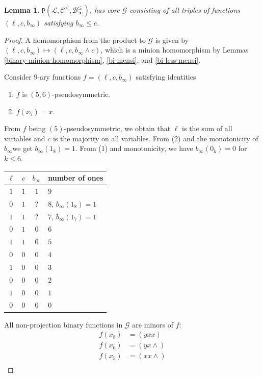 \documentclass{amsart}
\numberwithin{equation}{section}
\theoremstyle{plain}
\newtheorem{lemma}[theorem]{Lemma}
\theoremstyle{definition}
\def\clone#1{\mathcal{#1}}
\def\minion#1{\mathcal{#1}}
\def\Bc{\clone{B}}
\def\Lc{\clone{L}}
\def\Cc{\clone{C}}
\def\C#1{{\mathtt{P}}(#1)}
\begin{document}
\begin{lemma}\label{lcleqbleqinf} $\C{\Lc,\Cc^\leq,\Bc_\infty^\leq}$, has core $\minion{G}$ consisting of all triples of functions $(\ell,c,b_\infty)$ satisfying $b_\infty \leq c$.
\end{lemma}
\begin{proof}
  A homomorphism from the product to $\minion{G}$ is given by $(\ell,c,b_\infty)\mapsto (\ell,c,b_{\infty}\wedge c)$, which is a minion homomorphism
by Lemmas \ref{binary-minion-homomorphism}, \ref{bi-mensi}, and \ref{bi-less-mensi}.

Consider $9$-ary functions $f = (\ell,c,b_\infty)$ satisfying identities
\begin{enumerate}
    \item $f$ is $(5,6)$-pseudosymmetric.
    \item $f(x_{7}) = x$.
\end{enumerate}

From $f$ being $(5)$-pseudosymmetric, we obtain that $\ell$ is the sum of all variables and $c$ is the majority on all variables. From (2) and the monotonicity of $b_\infty $we get $b_\infty(1_8) = 1$. From (1) and monotonicity, we have $b_\infty(0_k) = 0$ for $k\leq 6$.

\begin{center}
\begin{tabular}{ |ccc|l } 
 \hline
 $\ell$ & $c$ & $b_\infty$  & number of ones \\ 
  \hline
$1$ & $1$ & $1$ & $9$ \\
$0$ & $1$ & ? & $8$, $b_\infty(1_8) = 1$ \\
$1$ & $1$ & ? & $7$, $b_\infty(1_7) = 1$\\
$0$ & $1$ & $0$ & $6$ \\
$1$ & $1$ & $0$ & $5$ \\ 
$0$ & $0$ & $0$ & $4$ \\
$1$ & $0$ & $0$ & $3$ \\ 
$0$ & $0$ & $0$ & $2$ \\
$1$ & $0$ & $0$ & $1$ \\ 
$0$ & $0$ & $0$ & $0$ \\
 \hline
\end{tabular}
\end{center}

All non-projection binary functions in $\minion{G}$ are minors of $f$:
\begin{align*}
f(x_8) &= (yxx) \\
f(x_6) &= (yx{\wedge}) \\
f(x_{5}) &= (xx{\wedge}) \\
\end{align*}


\end{proof}
\end{document}
